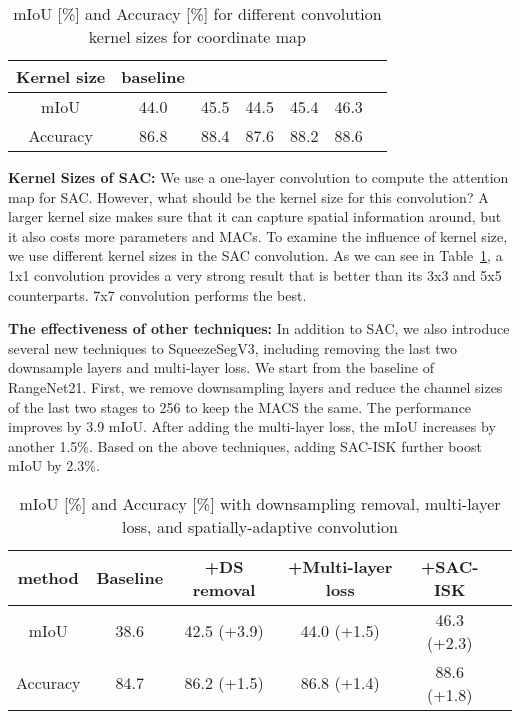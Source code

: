 \documentclass[runningheads]{llncs}
\begin{document}
\begin{table}[!t]
\footnotesize

\centering
\begin{tabular}{ c c c c c c c }
\hline
Kernel size & baseline &  &  &  &  \\
 \hline
 \hline
 mIoU&44.0&45.5 &44.5 &45.4 & 46.3\\
 Accuracy& 86.8& 88.4& 87.6&88.2 &88.6\\
\hline
\end{tabular}


\caption{mIoU [\%] and Accuracy [\%] for different convolution kernel sizes for coordinate map}
\label{tab:kernel}
\end{table}
\noindent\textbf{Kernel Sizes of SAC:}  We use a one-layer convolution to compute the attention map for SAC. However, what should be the kernel size for this convolution? A larger kernel size makes sure that it can capture spatial information around, but it also costs more parameters and MACs. To examine the influence of kernel size, we use different kernel sizes in the SAC convolution. As we can see in Table~\ref{tab:kernel}, a 1x1 convolution provides a very strong result that is better than its 3x3 and 5x5 counterparts. 7x7 convolution performs the best.  

\noindent\textbf{The effectiveness of other techniques:} In addition to SAC, we also introduce several new techniques to SqueezeSegV3, including removing the last two downsample layers and multi-layer loss. We start from the baseline of RangeNet21. 
First, we remove downsampling layers and reduce the channel sizes of the last two stages to 256 to keep the MACS the same. The performance improves by 3.9 mIoU. After adding the multi-layer loss, the mIoU increases by another 1.5\%. Based on the above techniques, adding SAC-ISK further boost mIoU by 2.3\%. 


\begin{table}[!t]

\footnotesize
\centering
\begin{tabular}{c c c c c c }
\hline
method& Baseline & +DS removal & +Multi-layer loss & +SAC-ISK & \\
 \hline
 \hline
 mIoU & 38.6&42.5 (+3.9) & 44.0 (+1.5)& 46.3 (+2.3)\\
 Accuracy & 84.7 & 86.2 (+1.5) &86.8 (+1.4) &88.6 (+1.8)\\
\hline
\end{tabular}

\caption{mIoU [\%] and Accuracy [\%] with downsampling removal, multi-layer loss, and spatially-adaptive convolution}
\label{tab:other}
\end{table}
\end{document}
